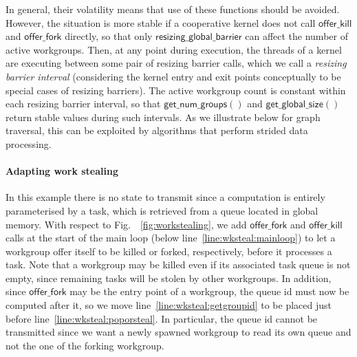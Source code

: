\documentclass[numbers,nocopyrightspace,10pt]{sigplanconf}
\newcommand{\myfig}{Fig.~}
\newcommand{\offerfork}{\mathsf{offer\_fork}}
\newcommand{\offerkill}{\mathsf{offer\_kill}}
\newcommand{\resizingglobalbarrier}{\mathsf{resizing\_global\_barrier}}
\newcommand{\getnumgroups}{\mathsf{get\_num\_groups}}
\newcommand{\getglobalsize}{\mathsf{get\_global\_size}}
\begin{document}
In general, their volatility means that use of these functions should be avoided.
However, the situation is more stable if a cooperative kernel does not call
$\offerkill$ and $\offerfork$ directly, so that only $\resizingglobalbarrier$ can affect the number of active
workgroups.  Then, at any point
during execution, the threads of a kernel are executing between some
pair of resizing barrier calls, which we call a \emph{resizing barrier
  interval} (considering the kernel entry and exit points
conceptually to be special cases of resizing barriers).  The active workgroup count is constant within each resizing
barrier interval, so that 
$\getnumgroups()$ and $\getglobalsize()$ return stable values during such intervals.
%
As we illustrate below for graph traversal, this can be exploited by algorithms that perform strided
data processing.


\paragraph{Adapting work stealing}

In this example there is no state to transmit since a computation is
entirely parameterised by a task, which is retrieved from a queue
located in global memory. With respect to \myfig~\ref{fig:workstealing},
we add $\offerfork$ and $\offerkill$ calls at the start of the main loop
(below line~\ref{line:wksteal:mainloop}) to let a workgroup offer itself
to be killed or forked, respectively, before it processes a task.  Note
that a workgroup may be killed even if its associated task queue is not
empty, since remaining tasks will be stolen by other workgroups. In
addition, since $\offerfork$ may be the entry point of a workgroup, the
queue id must now be computed after it, so we move
line~\ref{line:wksteal:getgroupid} to be placed just before
line~\ref{line:wksteal:poporsteal}. In particular, the queue id cannot
be transmitted since we want a newly spawned workgroup to read its own
queue and not the one of the forking workgroup.

\end{document}
